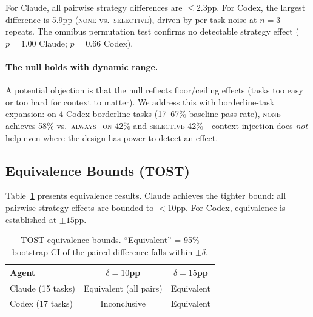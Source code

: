 \documentclass[11pt]{article}
\newcommand{\none}{\textsc{none}}
\newcommand{\alwayson}{\textsc{always\_on}}
\newcommand{\selective}{\textsc{selective}}
\begin{document}
For Claude, all pairwise strategy differences are ${\leq}2.3$pp.
For Codex, the largest difference is 5.9pp (\none{} vs.\ \selective{}), driven by per-task noise at $n{=}3$ repeats.
The omnibus permutation test confirms no detectable strategy effect ($p{=}1.00$ Claude; $p{=}0.66$ Codex).

\paragraph{The null holds with dynamic range.}
A potential objection is that the null reflects floor/ceiling effects (tasks too easy or too hard for context to matter).
We address this with borderline-task expansion: on 4 Codex-borderline tasks (17--67\% baseline pass rate), \none{} achieves 58\% vs.\ \alwayson{} 42\% and \selective{} 42\%---context injection does \emph{not} help even where the design has power to detect an effect.

\subsection{Equivalence Bounds (TOST)}

Table~\ref{tab:tost} presents equivalence results.
Claude achieves the tighter bound: all pairwise strategy effects are bounded to $<$10pp.
For Codex, equivalence is established at ${\pm}15$pp.

\begin{table}[t]
\centering
\small
\caption{TOST equivalence bounds. ``Equivalent'' = 95\% bootstrap CI of the paired difference falls within $\pm\delta$.}
\label{tab:tost}
\begin{tabular}{lcc}
\toprule
\textbf{Agent} & \textbf{$\delta{=}10$pp} & \textbf{$\delta{=}15$pp} \\
\midrule
Claude (15 tasks) & Equivalent (all pairs) & Equivalent \\
Codex (17 tasks)  & Inconclusive           & Equivalent \\
\bottomrule
\end{tabular}
\end{table}
\end{document}
